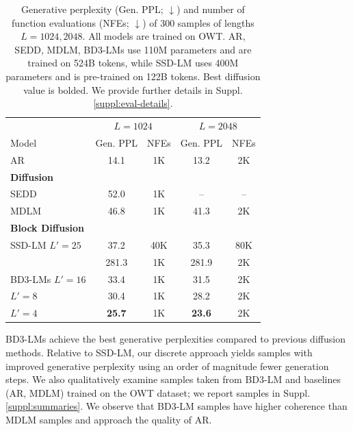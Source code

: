 \documentclass{article} %
\def\algos{BD3-LMs}
\def\algo{BD3-LM}
\begin{document}
\begin{table}[ht!]
    \small
  \caption{Generative perplexity (Gen. PPL; $\downarrow$) and number of function evaluations (NFEs; $\downarrow$) of 300 samples of lengths $L=1024, 2048$. All models are trained on OWT. AR, SEDD, MDLM, \algos{} use 110M parameters and are trained on 524B tokens, while SSD-LM uses 400M parameters and is pre-trained on 122B tokens. Best diffusion value is bolded. We provide further details in Suppl. \ref{suppl:eval-details}.}
  \label{tab:gen_ppl_2048}
  \centering
    \begin{tabular}{lcccc}
      \toprule
      & \multicolumn{2}{c}{$L=1024$} & \multicolumn{2}{c}{$L=2048$} \\
      \cmidrule(lr){2-3} \cmidrule(lr){4-5}
      Model & Gen. PPL & NFEs & Gen. PPL & NFEs \\
      \midrule
      AR & 14.1 & 1K & 13.2 & 2K \\
      \midrule 
      \multicolumn{5}{l}{\textbf{Diffusion}} \\
      SEDD & 52.0 & 1K & -- & -- \\
      MDLM & 46.8 & 1K & 41.3 & 2K \\
      \midrule
      \multicolumn{5}{l}{\textbf{Block Diffusion}} \\
      SSD-LM $L'=25$ & 37.2 & 40K & 35.3 & 80K  \\
      & 281.3 & 1K & 281.9 & 2K  \\
      \algos{} $L'=16$ & 33.4 & 1K & 31.5 & 2K \\
      \hspace{4.1em} $L'=8$ & 30.4 & 1K & 28.2 & 2K \\
      \hspace{4.1em} $L'=4$ & \textbf{25.7} & 1K & \textbf{23.6} & 2K \\
      \bottomrule
    \end{tabular}
\end{table}


\algos{} achieve the best generative perplexities compared to previous diffusion methods. Relative to SSD-LM, our discrete approach yields samples with improved generative perplexity using an order of magnitude fewer generation steps. We also qualitatively examine samples taken from \algo{} and baselines (AR, MDLM) trained on the OWT dataset; we report samples in Suppl. \ref{suppl:summaries}. We observe that \algo{} samples have higher coherence than MDLM samples and approach the quality of AR.
\end{document}

